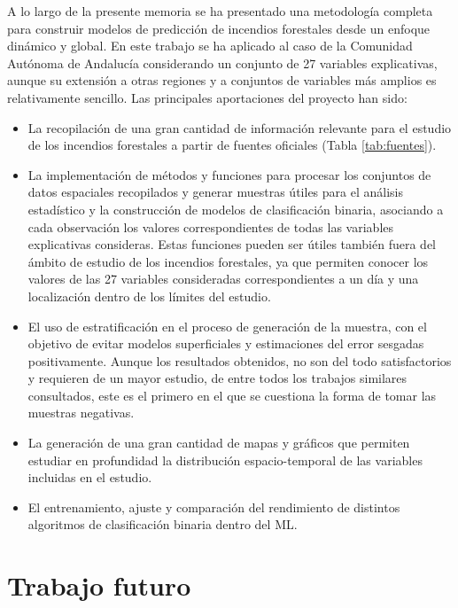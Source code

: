 \documentclass[12pt,a4paper,]{book}
\numberwithin{dummy}{section}
\theoremstyle{ocrenumbox}
\theoremstyle{blacknumex}
\theoremstyle{blacknumbox}
\theoremstyle{ocrenum}
\theoremstyle{ocrenum}
\begin{document}
A lo largo de la presente memoria se ha presentado una metodología
completa para construir modelos de predicción de incendios forestales
desde un enfoque dinámico y global. En este trabajo se ha aplicado al
caso de la Comunidad Autónoma de Andalucía considerando un conjunto de
27 variables explicativas, aunque su extensión a otras regiones y a
conjuntos de variables más amplios es relativamente sencillo. Las
principales aportaciones del proyecto han sido:

\begin{itemize}
\item
  La recopilación de una gran cantidad de información relevante para el
  estudio de los incendios forestales a partir de fuentes oficiales
  (Tabla \ref{tab:fuentes}).
\item
  La implementación de métodos y funciones para procesar los conjuntos
  de datos espaciales recopilados y generar muestras útiles para el
  análisis estadístico y la construcción de modelos de clasificación
  binaria, asociando a cada observación los valores correspondientes de
  todas las variables explicativas consideras. Estas funciones pueden
  ser útiles también fuera del ámbito de estudio de los incendios
  forestales, ya que permiten conocer los valores de las 27 variables
  consideradas correspondientes a un día y una localización dentro de
  los límites del estudio.
\item
  El uso de estratificación en el proceso de generación de la muestra,
  con el objetivo de evitar modelos superficiales y estimaciones del
  error sesgadas positivamente. Aunque los resultados obtenidos, no son
  del todo satisfactorios y requieren de un mayor estudio, de entre
  todos los trabajos similares consultados, este es el primero en el que
  se cuestiona la forma de tomar las muestras negativas.
\item
  La generación de una gran cantidad de mapas y gráficos que permiten
  estudiar en profundidad la distribución espacio-temporal de las
  variables incluidas en el estudio.
\item
  El entrenamiento, ajuste y comparación del rendimiento de distintos
  algoritmos de clasificación binaria dentro del ML.
\end{itemize}

\hypertarget{trabajo-futuro}{%
\section{Trabajo futuro}\label{trabajo-futuro}}
\end{document}
